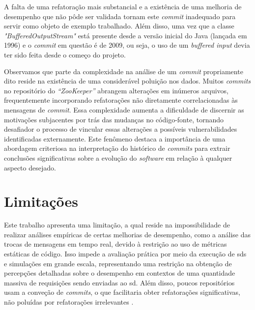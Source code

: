 A falta de uma refatoração mais substancial e a existência de uma melhoria de desempenho que não pôde ser validada tornam este \textit{commit} inadequado para servir como objeto de exemplo trabalhado. Além disso, uma vez que a classe \textit{"BufferedOutputStream"} está presente desde a versão inicial do Java (lançada em 1996) e o \textit{commit} em questão é de 2009, ou seja, o uso de um \textit{buffered input} devia ter sido feita desde o começo do projeto.


Observamos que parte da complexidade na análise de um \textit{commit} propriamente dito reside na existência de uma considerável poluição nos dados. Muitos \textit{commits} no repositório do \textit{``ZooKeeper''} abrangem alterações em inúmeros arquivos, frequentemente incorporando refatorações não diretamente correlacionadas às mensagens de \textit{commit}. Essa complexidade aumenta a dificuldade de discernir as motivações subjacentes por trás das mudanças no código-fonte, tornando desafiador o processo de vincular essas alterações a possíveis vulnerabilidades identificadas externamente. Este fenômeno destaca a importância de uma abordagem criteriosa na interpretação do histórico de \textit{commits} para extrair conclusões significativas sobre a evolução do \textit{software} em relação à qualquer aspecto desejado.

\section{Limitações}
\label{sec:limitacoes}

Este trabalho apresenta uma limitação, a qual reside na impossibilidade de realizar análises empíricas de certas melhorias de desempenho, como a análise das trocas de mensagens em tempo real, devido à restrição ao uso de métricas estáticas de código. Isso impede a avaliação prática por meio da execução de \gls{sds} e simulações em grande escala, representando uma restrição na obtenção de percepções detalhadas sobre o desempenho em contextos de uma quantidade massiva de requisições sendo enviadas ao \gls{sd}. Além disso, poucos repositórios usam a conveção de \textit{commits}, o que facilitaria obter refatorações significativas, não poluídas por refatorações irrelevantes \cite{conventionalcommits}.